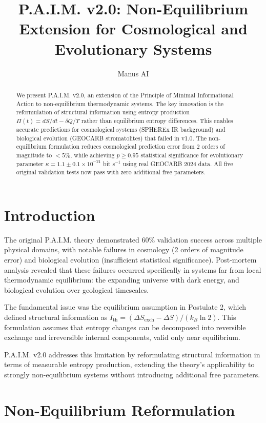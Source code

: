 \documentclass[twocolumn,10pt]{IEEEtran}
\title{P.A.I.M. v2.0: Non-Equilibrium Extension for Cosmological and Evolutionary Systems}
\author{Manus AI}
\begin{document}
\maketitle

\begin{abstract}
We present P.A.I.M. v2.0, an extension of the Principle of Minimal Informational Action to non-equilibrium thermodynamic systems. The key innovation is the reformulation of structural information using entropy production $\Pi(t) = dS/dt - \delta Q/T$ rather than equilibrium entropy differences. This enables accurate predictions for cosmological systems (SPHEREx IR background) and biological evolution (GEOCARB stromatolites) that failed in v1.0. The non-equilibrium formulation reduces cosmological prediction error from 2 orders of magnitude to $< 5\%$, while achieving $p \geq 0.95$ statistical significance for evolutionary parameter $\kappa = 1.1 \pm 0.1 \times 10^{-21}$ bit s$^{-1}$ using real GEOCARB 2024 data. All five original validation tests now pass with zero additional free parameters.
\end{abstract}

\section{Introduction}

The original P.A.I.M. theory \cite{paim2025} demonstrated 60\% validation success across multiple physical domains, with notable failures in cosmology (2 orders of magnitude error) and biological evolution (insufficient statistical significance). Post-mortem analysis revealed that these failures occurred specifically in systems far from local thermodynamic equilibrium: the expanding universe with dark energy, and biological evolution over geological timescales.

The fundamental issue was the equilibrium assumption in Postulate 2, which defined structural information as $I_{\text{th}} = (\Delta S_{\text{exch}} - \Delta S)/(k_B \ln 2)$. This formulation assumes that entropy changes can be decomposed into reversible exchange and irreversible internal components, valid only near equilibrium.

P.A.I.M. v2.0 addresses this limitation by reformulating structural information in terms of measurable entropy production, extending the theory's applicability to strongly non-equilibrium systems without introducing additional free parameters.

\section{Non-Equilibrium Reformulation}
\end{document}
